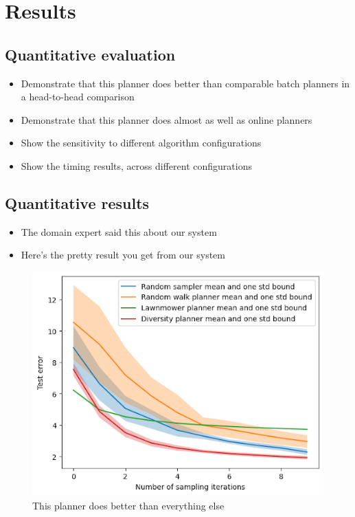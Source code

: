 \chapter{Results} \label{chapResults}
\section{Quantitative evaluation}
\begin{itemize}
    \item Demonstrate that this planner does better than comparable batch planners in a head-to-head comparison
    \item Demonstrate that this planner does almost as well as online planners 
    \item Show the sensitivity to different algorithm configurations 
    \item Show the timing results, across different configurations
\end{itemize}

\section{Quantitative results}
\begin{itemize}
    \item The domain expert said this about our system 
    \item Here's the pretty result you get from our system
\end{itemize}

\begin{figure}
    \centering
    \includegraphics[width=\textwidth]{figs/results/GP_performance.png}
    \caption{This planner does better than everything else}
    \label{fig:quantitative}
\end{figure}

